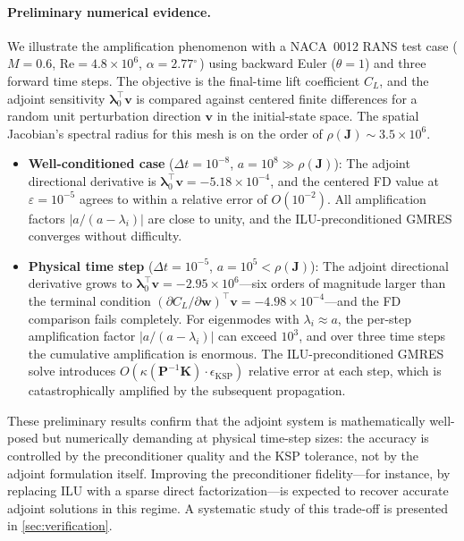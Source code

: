 \documentclass[journal]{new-aiaa}
\newcommand{\degree}{\ensuremath{^\circ\,}}
\newcommand{\mb}[1]{\mathbf{#1}}
\newcommand{\mbg}[1]{\bm{#1}}
\newcommand{\p}{\partial}
\begin{document}
\paragraph{Preliminary numerical evidence.}
We illustrate the amplification phenomenon with a NACA~0012 RANS test case ($M = 0.6$, $\text{Re} = 4.8 \times 10^6$, $\alpha = 2.77\degree$) using backward Euler ($\theta = 1$) and three forward time steps.
The objective is the final-time lift coefficient $C_L$, and the adjoint sensitivity $\mbg{\lambda}_0^\intercal \mb{v}$ is compared against centered finite differences for a random unit perturbation direction $\mb{v}$ in the initial-state space.
The spatial Jacobian's spectral radius for this mesh is on the order of $\rho(\mb{J}) \sim 3.5 \times 10^6$.
\begin{itemize}
  \item \textbf{Well-conditioned case} ($\Delta t = 10^{-8}$, $a = 10^8 \gg \rho(\mb{J})$):
    The adjoint directional derivative is $\mbg{\lambda}_0^\intercal \mb{v} = -5.18 \times 10^{-4}$, and the centered FD value at $\varepsilon = 10^{-5}$ agrees to within a relative error of $O(10^{-2})$.
    All amplification factors $|a/(a - \lambda_i)|$ are close to unity, and the ILU-preconditioned GMRES converges without difficulty.
  \item \textbf{Physical time step} ($\Delta t = 10^{-5}$, $a = 10^5 < \rho(\mb{J})$):
    The adjoint directional derivative grows to $\mbg{\lambda}_0^\intercal \mb{v} = -2.95 \times 10^{6}$---six orders of magnitude larger than the terminal condition $(\p C_L / \p \mb{w})^\intercal \mb{v} = -4.98 \times 10^{-4}$---and the FD comparison fails completely.
    For eigenmodes with $\lambda_i \approx a$, the per-step amplification factor $|a/(a - \lambda_i)|$ can exceed $10^3$, and over three time steps the cumulative amplification is enormous.
    The ILU-preconditioned GMRES solve introduces $O(\kappa(\mb{P}^{-1}\mb{K}) \cdot \epsilon_{\text{KSP}})$ relative error at each step, which is catastrophically amplified by the subsequent propagation.
\end{itemize}
These preliminary results confirm that the adjoint system is mathematically well-posed but numerically demanding at physical time-step sizes: the accuracy is controlled by the preconditioner quality and the KSP tolerance, not by the adjoint formulation itself.
Improving the preconditioner fidelity---for instance, by replacing ILU with a sparse direct factorization---is expected to recover accurate adjoint solutions in this regime.
A systematic study of this trade-off is presented in \cref{sec:verification}.
\end{document}
